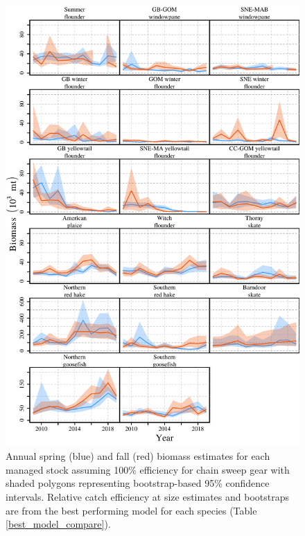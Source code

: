 \documentclass[
  12pt,
]{article}
\begin{document}
\clearpage

\begin{figure}
\caption{Annual spring (blue) and fall (red) biomass estimates for each managed stock assuming 100\% efficiency for chain sweep gear with shaded polygons representing bootstrap-based 95\% confidence intervals. Relative catch efficiency at size estimates and bootstraps are from the best performing model for each species (Table \ref{best_model_compare}).}\label{stock_biomass_plot}
\begin{center}
\includegraphics[height = 0.8\textheight]{stock_biomass_plot.pdf}
\end{center}
\end{figure}

\clearpage
\end{document}
